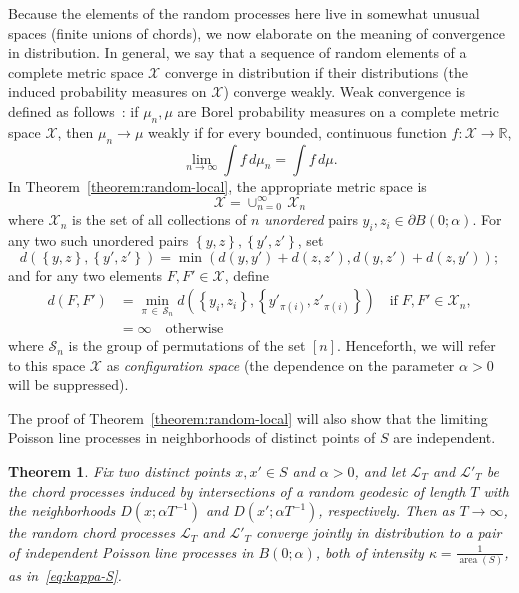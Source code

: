 \documentclass[10pt]{amsart}
\newtheorem{theo}{Theorem}[section]
\theoremstyle{definition}\newtheorem{defi}[theo]{Definition}\newtheorem{rema}[theo]{Remark}\newtheorem{exam}[theo]{Example}\newtheorem{exem}[theo]{Example}\newtheorem{nota}[theo]{Notation}
\newcommand{\xset}[1]{\left\{ #1 \right\}}
\newcommand{\zz}[1]{\mathbb #1}
\DeclareMathOperator{\area}{area}
\begin{document}
Because the elements of the random processes here live in somewhat unusual spaces (finite unions of chords), we now elaborate on the meaning of convergence in distribution. In general, we say that a sequence of random elements of a complete metric space $\mathcal{X}$ converge in distribution if their distributions (the induced probability measures on $\mathcal{X}$) converge weakly. Weak convergence is defined as follows~\cite{billingsley}: if $\mu_{n},\mu$ are Borel probability measures on a complete metric space $\mathcal{X}$, then $\mu_{n}\rightarrow \mu$ weakly if for every bounded, continuous function $f:\mathcal{X}\rightarrow \zz{R}$,
\begin{equation}\label{eq:weak-conv-definition}
\lim_{n \rightarrow\infty}\int f\, d\mu_{n} =\int f \,d\mu.
\end{equation}
In Theorem~\ref{theorem:random-local}, the appropriate metric space is
\[
\mathcal{X}=\cup_{n=0}^{\infty}\,\mathcal{X}_{n}
\]
where $\mathcal{X}_{n}$ is the set of all collections of $n$ \emph{unordered} pairs $y_{i}, z_{i}\in \partial B (0;\alpha)$. For any two such unordered pairs $\xset {y,z}, \xset {y',z'}$, set
\[
d\left(\xset {y,z}, \xset {y',z'}\right)=\min (d(y,y')+d(z,z'),d(y,z')+d(z,y'));
\]
and for any two elements $F,F'\in \mathcal{X}$, define
\begin{align*}
d(F,F')&= \min _{\pi\,\in\,\mathcal{S}_{n}} d\left (\xset {y_{i},z_{i}},\xset {y'_{ \pi (i)},z'_{\pi (i)}}\right) \quad
\text{if} \; F,F' \in \mathcal{X}_{n}, \\
&= \infty \quad \text{otherwise}
\end{align*}
where $\mathcal{S}_{n}$ is the group of permutations of the set $[n]$. Henceforth, we will refer to this space $\mathcal{X}$ as \emph{configuration space} (the dependence on the parameter $\alpha >0$ will be suppressed).

The proof of Theorem~\ref{theorem:random-local} will also show that the limiting Poisson line processes in neighborhoods of distinct points of $S$ are independent.


\begin{theo}\label{theorem:random-local-pairs}
Fix two distinct points $x,x'\in S$ and $\alpha >0$, and let $\mathcal{L}_{T}$ and $\mathcal{L}'_{T}$ be the chord processes induced by intersections of a random geodesic of length $T$ with the neighborhoods $D(x;\alpha T^{-1})$ and $D(x';\alpha T^{-1})$, respectively. Then as $T \rightarrow \infty$, the random chord processes $\mathcal{L}_{T}$ and $\mathcal{L}'_{T}$ converge jointly in distribution to a pair of independent Poisson line processes in $B (0;\alpha)$, both of intensity $\kappa = \frac{1}{\area(S)}$, as in~\eqref{eq:kappa-S}.
\end{theo}
\end{document}

